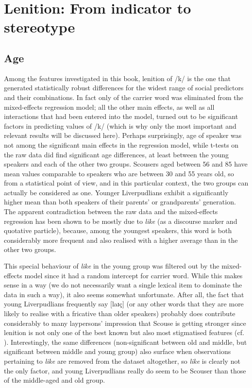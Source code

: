 \section{Lenition: From indicator to stereotype}
\label{prod.disc.k}

\subsection{Age}
\label{prod.disc.k.age}

Among the features investigated in this book, lenition of /k/ is the one that generated statistically robust differences for the widest range of social predictors and their combinations.
In fact only  of the carrier word was eliminated from the mixed-effects regression model; all the other main effects, as well as all interactions that had been entered into the model, turned out to be significant factors in predicting  values of /k/ (which is why only the most important and relevant results will be discussed here).
Perhaps surprisingly, age of speaker was not among the significant main effects in the regression model, while t-tests on the raw data did find significant age differences, at least between the young speakers and each of the other two groups.
Scousers aged between 56 and 85 have mean  values comparable to speakers who are between 30 and 55 years old, so from a statistical point of view, and in this particular context, the two groups can actually be considered as one.
Younger Liverpudlians exhibit a significantly higher mean  than both speakers of their parents' or grandparents' generation.
The apparent contradiction between the raw data and the mixed-effects regression has been shown to be mostly due to \emph{like} (as a discourse marker and quotative particle), because, among the youngest speakers, this word is both considerably more frequent and also realised with a higher average  than in the other two groups. 

This special behaviour of \emph{like} in the young group was filtered out by the mixed-effects model since it had a random intercept for carrier word.
While this makes sense in a way (we do not necessarily want a single lexical item to dominate the data in such a way), it also seems somewhat unfortunate.
After all, the fact that young Liverpudlians frequently say [laɪç] (or any other words that they are more likely to realise with a fricative than older speakers) probably does contribute considerably to many laypersons' impression that Scouse is getting stronger since lenition is not only one of the best known but also most stigmatised features (cf. ).
Interestingly, the same differences (non-significant between old and middle, but significant between middle and young group) also surface when observations pertaining to \emph{like} are removed from the dataset altogether, so \emph{like} is clearly not the only factor, and young Liverpudlians really do seem to be Scouser than those of the middle-aged and old group.

